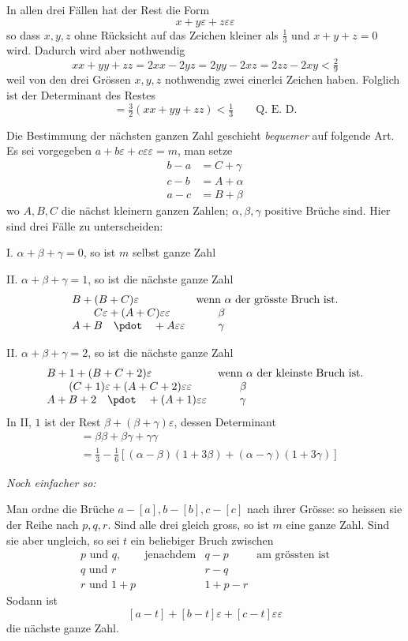 In allen drei Fällen hat der Rest die Form
\[
x+y\varepsilon+z\varepsilon\varepsilon
\]
so dass $x,y,z$ ohne Rücksicht auf das Zeichen kleiner als $\frac13$ und $x+y+z=0$ wird. Dadurch wird aber nothwendig
\[
xx+yy+zz=2xx-2yz=2yy-2xz=2zz-2xy<\tfrac29
\]
weil von den drei Grössen $x,y,z$ nothwendig zwei einerlei Zeichen haben. Folglich ist der Determinant des Restes
\[
=\tfrac32(xx+yy+zz)<\tfrac13\qquad\text{Q. E. D.}
\]

Die Bestimmung der nächsten ganzen Zahl geschieht \emph{bequemer} auf folgende Art. Es sei vorgegeben $a+b\varepsilon+c\varepsilon\varepsilon=m$, man setze
\[
\begin{aligned}
b-a&=C+\gamma\\
c-b&=A+\alpha\\
a-c&=B+\beta
\end{aligned}
\]
wo $A,B,C$ die nächst kleinern ganzen Zahlen; $\alpha,\beta,\gamma$ positive Brüche sind.
Hier sind drei Fälle zu unterscheiden:

%
I. $\alpha+\beta+\gamma=0$, so ist $m$ selbst ganze Zahl

II. $\alpha+\beta+\gamma=1$, so ist die nächste ganze Zahl
\[
\begin{array}{ll}
B+(B+C)\varepsilon&\text{wenn }\alpha\text{ der grösste Bruch ist.}\\
\qquad C\varepsilon+(A+C)\varepsilon\varepsilon&\qquad\beta\\
A+B\quad\pdot\quad+A\varepsilon\varepsilon&\qquad\gamma
\end{array}
\]

II. $\alpha+\beta+\gamma=2$, so ist die nächste ganze Zahl
\[
\begin{array}{ll}
B+1+(B+C+2)\varepsilon&\text{wenn }\alpha\text{ der kleinste Bruch ist.}\\
\qquad(C+1)\varepsilon+(A+C+2)\varepsilon\varepsilon&\qquad\beta\\
A+B+2\quad\pdot\quad+(A+1)\varepsilon\varepsilon&\qquad\gamma
\end{array}
\]
In II, $1$ ist der Rest $\beta+(\beta+\gamma)\varepsilon$, dessen Determinant
\[
\begin{aligned}
&=\beta\beta+\beta\gamma+\gamma\gamma\\
&=\tfrac13-\tfrac16[(\alpha-\beta)(1+3\beta)+(\alpha-\gamma)(1+3\gamma)]
\end{aligned}
\]

\emph{Noch einfacher so:}

Man ordne die Brüche $a-[a],b-[b],c-[c]$ nach ihrer Grösse: so heissen sie der Reihe nach $p,q,r$. Sind alle drei gleich gross, so ist $m$ eine ganze Zahl. Sind sie aber ungleich, so sei $t$ ein beliebiger Bruch zwischen
\[
\begin{array}{llll}
p\text{ und }q,&\text{jenachdem}&q-p&\text{am grössten ist}\\
q\text{ und }r&&r-q&\\
r\text{ und }1+p&&1+p-r&
\end{array}
\]
Sodann ist
\[
[a-t]+[b-t]\varepsilon+[c-t]\varepsilon\varepsilon
\]
die nächste ganze Zahl.

